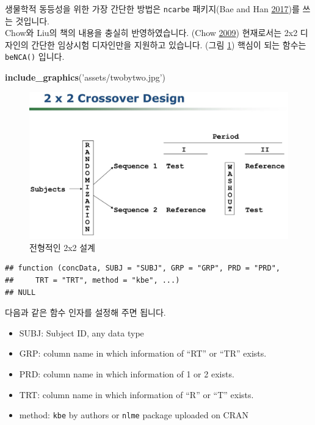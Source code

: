 \documentclass[12pt,]{krantz}
\newenvironment{Shaded}{\begin{snugshade}}{\end{snugshade}}
\newcommand{\KeywordTok}[1]{\textcolor[rgb]{0.13,0.29,0.53}{\textbf{#1}}}
\newcommand{\StringTok}[1]{\textcolor[rgb]{0.31,0.60,0.02}{#1}}
\newcommand{\NormalTok}[1]{#1}
\providecommand{\tightlist}{%
  \setlength{\itemsep}{0pt}\setlength{\parskip}{0pt}}
\theoremstyle{definition}
\theoremstyle{definition}
\theoremstyle{definition}
\theoremstyle{remark}
\begin{document}
생물학적 동등성을 위한 가장 간단한 방법은 \texttt{ncarbe} 패키지(Bae and
Han \protect\hyperlink{ref-R-ncarbe}{2017})를 쓰는 것입니다.\\
Chow와 Liu의 책의 내용을 충실히 반영하였습니다. (Chow
\protect\hyperlink{ref-chow2009design}{2009}) 현재로서는 2x2 디자인의
간단한 임상시험 디자인만을 지원하고 있습니다. (그림 \ref{fig:twobytwo})
핵심이 되는 함수는 \texttt{beNCA()} 입니다.

\begin{Shaded}
\begin{Highlighting}[]
\KeywordTok{include_graphics}\NormalTok{(}\StringTok{'assets/twobytwo.jpg'}\NormalTok{)}
\end{Highlighting}
\end{Shaded}

\begin{figure}
\includegraphics[width=18.01in]{assets/twobytwo} \caption{전형적인 2x2 설계}\label{fig:twobytwo}
\end{figure}

\begin{verbatim}
## function (concData, SUBJ = "SUBJ", GRP = "GRP", PRD = "PRD", 
##     TRT = "TRT", method = "kbe", ...) 
## NULL
\end{verbatim}

다음과 같은 함수 인자를 설정해 주면 됩니다.

\begin{itemize}
\tightlist
\item
  SUBJ: Subject ID, any data type
\item
  GRP: column name in which information of ``RT'' or ``TR'' exists.
\item
  PRD: column name in which information of 1 or 2 exists.
\item
  TRT: column name in which information of ``R'' or ``T'' exists.
\item
  method: \texttt{kbe} by authors or \texttt{nlme} package uploaded on
  CRAN
\end{itemize}
\end{document}
